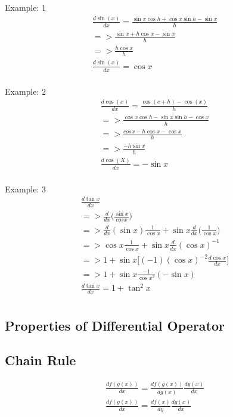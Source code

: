 	Example: 1
	\begin{align}
		\frac{d\sin(x)}{dx} = \frac{\sin x \cos h+\cos x\sin h-\sin x}{h} \\
		=> \frac{\sin x + h\cos x - \sin x}{h} \\
		=>\frac{h\cos x}{h} \\
		\frac{d\sin(x)}{dx} = \cos x \\
	\end{align}
	
	Example: 2
	\begin{align}
		\frac{d\cos(x)}{dx} = \frac{\cos(c+h)-\cos (x)}{h} \\
		=> \frac{\cos x \cos h-\sin x \sin h - \cos x}{h} \\
		=> \frac{cos x- h \cos x - \cos x}{h} \\
		=> \frac{-h\sin x}{h} \\
		\frac{d\cos (X)}{dx} = -\sin x \\
	\end{align}
	
	Example: 3
	\begin{align}
		\frac{d\tan x}{dx} \\
		=>\frac{d}{dx}\bigg(\frac{\sin x}{cos x}\bigg) \\
		=>\frac{d}{dx}(\sin x)\frac{1}{\cos x}+\sin x \frac{d}{dx}\bigg(\frac{1}{\cos x}\bigg)\\
		=>\cos x \frac{1}{\cos x}+\sin x\frac{d}{dx}(\cos x)^{-1} \\
		=> 1+\sin x\bigg[(-1)(\cos x)^{-2}\frac{d\cos x}{dx}\bigg] \\
		=> 1+\sin x\frac{-1}{\cos x^2}(-\sin x) \\
		\frac{d \tan x}{dx} = 1 + \tan^2 x \\
	\end{align}


	\subsection{Properties of Differential Operator}
	
	
	
	
	\subsection{Chain Rule}
	
	\begin{align}
		\frac{df(g(x))}{dx} = \frac{df(g(x))}{dg(x)}\frac{dy(x)}{dx}  \\
		\frac{df(g(x))}{dx} = \frac{df(x)}{dy}\frac{dg(x)}{dx} \\
	\end{align}	

